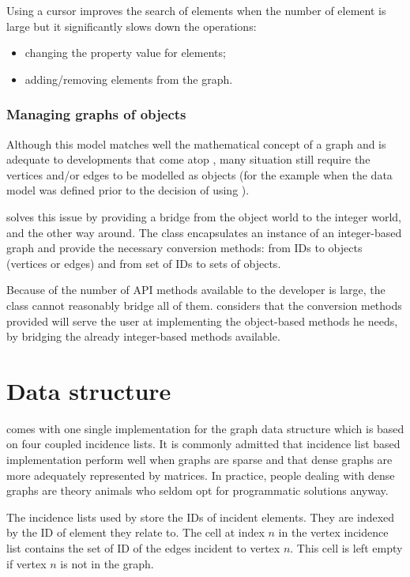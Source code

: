 \documentclass{article}
\begin{document}
Using a cursor improves the search of elements when the number of element is large but it significantly slows down the operations:
\begin{itemize}
  \item changing the property value for elements;
  \item adding/removing elements from the graph.
\end{itemize}

\subsubsection{Managing graphs of objects}
Although this model matches well the mathematical concept of a graph and is adequate to developments that come atop \grph, 
many situation still require the vertices and/or edges to be modelled as objects (for the example when the data model was
defined prior to the decision of using \grph).

\grph solves this issue by providing a bridge from the object world to the integer world, and the other way around.
The class  encapsulates an instance of an integer-based graph and provide
the necessary conversion methods: from IDs to objects (vertices or edges) and from set of IDs to sets of objects.

Because of the number of API methods \grph available to the developer is large, the class  cannot
reasonably bridge all of them. \grph considers that the conversion methods provided will serve the user at implementing the  
object-based methods he needs, by bridging the already  integer-based methods available.


\section{Data structure}

\grph comes with one single implementation for the graph data structure which is based on four coupled incidence lists.
It is commonly admitted that incidence list based implementation perform well when graphs are sparse and that dense graphs
are more adequately represented by matrices. In practice, people dealing with dense graphs are theory animals who
seldom opt for programmatic solutions anyway.

The incidence lists used by \grph store the IDs of incident elements. They are indexed by the ID of element they relate to.
The cell at index $n$ in the vertex incidence list contains the set of ID of the edges incident to vertex $n$. This
cell is left empty if vertex $n$ is not in the graph.
\end{document}
